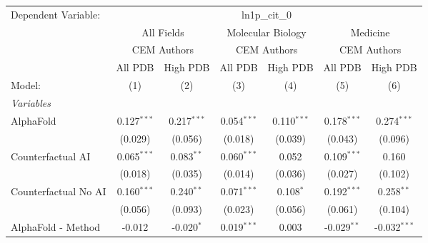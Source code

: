 \begingroup
\centering
\begin{tabular}{lcccccc}
   \tabularnewline \midrule \midrule
   Dependent Variable: & \multicolumn{6}{c}{ln1p\_cit\_0}\\
 & \multicolumn{2}{c}{All Fields} & \multicolumn{2}{c}{Molecular Biology} & \multicolumn{2}{c}{Medicine} \\
\cmidrule(lr){2-3} \cmidrule(lr){4-5} \cmidrule(lr){6-7}
 & \multicolumn{2}{c}{CEM Authors} & \multicolumn{2}{c}{CEM Authors} & \multicolumn{2}{c}{CEM Authors} \\
\cmidrule(lr){2-3} \cmidrule(lr){4-5} \cmidrule(lr){6-7}
 & \multicolumn{1}{c}{All PDB} & \multicolumn{1}{c}{High PDB} & \multicolumn{1}{c}{All PDB} & \multicolumn{1}{c}{High PDB} & \multicolumn{1}{c}{All PDB} & \multicolumn{1}{c}{High PDB} \\
\cmidrule(lr){2-2} \cmidrule(lr){3-3} \cmidrule(lr){4-4} \cmidrule(lr){5-5} \cmidrule(lr){6-6} \cmidrule(lr){7-7}
   Model:                                                     & (1)           & (2)           & (3)           & (4)           & (5)           & (6)\\  
   \midrule
   \emph{Variables}\\
   AlphaFold                                                  & 0.127$^{***}$ & 0.217$^{***}$ & 0.054$^{***}$ & 0.110$^{***}$ & 0.178$^{***}$ & 0.274$^{***}$\\   
                                                              & (0.029)       & (0.056)       & (0.018)       & (0.039)       & (0.043)       & (0.096)\\   
   Counterfactual AI                                          & 0.065$^{***}$ & 0.083$^{**}$  & 0.060$^{***}$ & 0.052         & 0.109$^{***}$ & 0.160\\   
                                                              & (0.018)       & (0.035)       & (0.014)       & (0.036)       & (0.027)       & (0.102)\\   
   Counterfactual No AI                                       & 0.160$^{***}$ & 0.240$^{**}$  & 0.071$^{***}$ & 0.108$^{*}$   & 0.192$^{***}$ & 0.258$^{**}$\\   
                                                              & (0.056)       & (0.093)       & (0.023)       & (0.056)       & (0.061)       & (0.104)\\   
   AlphaFold - Method                                         & -0.012        & -0.020$^{*}$  & 0.019$^{***}$ & 0.003         & -0.029$^{**}$ & -0.032$^{***}$\\   

\end{tabular}
